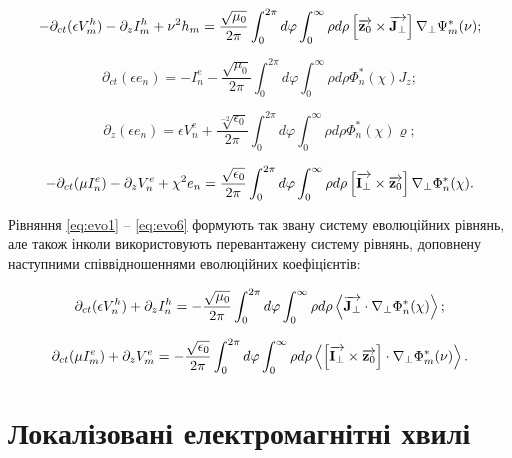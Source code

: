 \begin{equation} \label{eq:evo3}
- \partial_{ct} (\epsilon V_m^h) - \partial_z I_m^h + \nu^2 h_m = 
\frac{\sqrt{\mu_0}}{2 \pi} \int_0^{2\pi} d \varphi 
\int_0^{\infty} \rho d \rho \left[ \overrightarrow{\mathbf z_0} \times \overrightarrow{\mathbf J_\perp} \right]
\nabla_\perp \Psi_m^* (\nu);
\end{equation}

\begin{equation} \label{eq:evo4}
\partial_{ct} (\epsilon e_n) = - I_n^e - 
\frac{\sqrt{\mu_0}}{2 \pi} \int_0^{2\pi} d \varphi 
\int_0^{\infty} \rho d \rho \Phi_n^* (\chi) J_z;
\end{equation}

\begin{equation} \label{eq:evo5}
\partial_{z} (\epsilon e_n) = \epsilon V_n^e + 
\frac{\sqrt[-2]{\epsilon_0}}{2 \pi} \int_0^{2\pi} d \varphi 
\int_0^{\infty} \rho d \rho \Phi_n^* (\chi) \varrho;
\end{equation}

\begin{equation} \label{eq:evo6}
- \partial_{ct}(\mu I_n^e) - \partial_z V_n^e + \chi^2 e_n = 
\frac{\sqrt{\epsilon_0}}{2 \pi} \int_0^{2\pi} d \varphi 
\int_0^{\infty} \rho d \rho \left[ \overrightarrow{\mathbf I_\perp} \times \overrightarrow{\mathbf z_0} \right]
\nabla_\perp \Phi_n^* (\chi).
\end{equation}

Рівняння \eqref{eq:evo1} -- \eqref{eq:evo6} формують так звану систему 
еволюційних рівнянь, але також інколи використовують перевантажену систему 
рівнянь, доповнену наступними співвідношеннями еволюційних коефіцієнтів:

\begin{equation}
\partial_{ct} (\epsilon V_n^h) + \partial_z I_n^h = 
- \frac{\sqrt{\mu_0}}{2 \pi} \int_0^{2\pi} d \varphi 
\int_0^{\infty} \rho d \rho 
\left< \overrightarrow{\mathbf J_\perp} \cdot \nabla_\perp \Phi_n^* (\chi) \right>;
\end{equation}

\begin{equation}
\partial_{ct}(\mu I_m^e) + \partial_z V_m^e = - 
\frac{\sqrt{\epsilon_0}}{2 \pi} \int_0^{2\pi} d \varphi 
\int_0^{\infty} \rho d \rho 
\left< \left[ \overrightarrow{\mathbf I_\perp} \times \overrightarrow{\mathbf z_0} \right]  \cdot  \nabla_\perp \Phi_m^* (\nu)  \right>.
\end{equation}

\section{Локалізовані електромагнітні хвилі}

